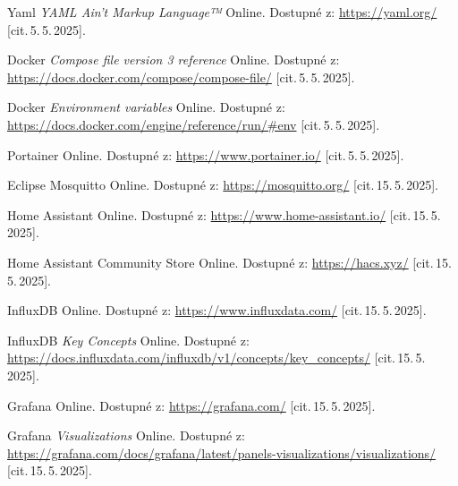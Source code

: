 \begin{thebibliography}{99}
		Yaml \emph{YAML Ain't Markup Language™}\/ Online. 
		Dostupné z:
	\url{https://yaml.org/}
		[cit.\,5.\,5.\,2025].

		Docker \emph{Compose file version 3 reference}\/ Online. 
		Dostupné z:
	\url{https://docs.docker.com/compose/compose-file/}
		[cit.\,5.\,5.\,2025].

		Docker \emph{Environment variables}\/ Online. 
		Dostupné z:
	\url{https://docs.docker.com/engine/reference/run/#env}
		[cit.\,5.\,5.\,2025].

		Portainer\/ Online. 
		Dostupné z:
	\url{https://www.portainer.io/}
		[cit.\,5.\,5.\,2025].

		Eclipse Mosquitto\/ Online. 
		Dostupné z:
	\url{https://mosquitto.org/}
		[cit.\,15.\,5.\,2025].

		Home Assistant\/ Online. 
		Dostupné z:
	\url{https://www.home-assistant.io/}
		[cit.\,15.\,5.\,2025].

		Home Assistant Community Store\/ Online. 
		Dostupné z:
	\url{https://hacs.xyz/}
		[cit.\,15.\,5.\,2025].

		InfluxDB\/ Online. 
		Dostupné z:
	\url{https://www.influxdata.com/}
		[cit.\,15.\,5.\,2025].

		InfluxDB \emph{Key Concepts}\/ Online. 
		Dostupné z:
	\url{https://docs.influxdata.com/influxdb/v1/concepts/key_concepts/}
		[cit.\,15.\,5.\,2025].

		Grafana\/ Online. 
		Dostupné z:
	\url{https://grafana.com/}
		[cit.\,15.\,5.\,2025].

		Grafana \emph{Visualizations}\/ Online. 
		Dostupné z:
	\url{https://grafana.com/docs/grafana/latest/panels-visualizations/visualizations/}
		[cit.\,15.\,5.\,2025].
\end{thebibliography} 
%
%
%
